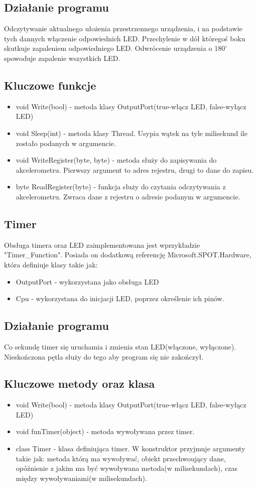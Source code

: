 \documentclass{article}
\begin{document}
\subsection*{Działanie programu}
Odczytywanie aktualnego ułożenia przestrzennego urządzenia, i na podstawie tych dannych włączenie odpowiednich LED. Przechylenie w dół któregoś boku skutkuje zapaleniem odpowiedniego LED. Odwrócenie urządzenia o $180^{\circ}$ spowoduje zapalenie wszystkich LED.
\subsection*{Kluczowe funkcje}
\begin{itemize}
\item void Write(bool) - metoda klasy OutputPort(true-włącz LED, false-wyłącz LED)
\item void Sleep(int) - metoda klasy Thread. Usypia wątek na tyle milisekund ile zostało podanych w argumencie.
\item void WriteRegister(byte, byte) - metoda służy do zapisywania do akcelerometru. Pierwszy argument to adres rejestru, drugi to dane do zapisu. 
\item byte ReadRegister(byte) - funkcja służy do czytania odczytywania z akcelerometru. Zwraca dane z rejestru o adresie podanym w argumencie. 
\end{itemize}
\subsection{Timer}
Obsługa timera oraz LED zaimplementowana jest wprzykładzie "Timer\_Function". Posiada on dodatkową referencję Microsoft.SPOT.Hardware, która definiuje klasy takie jak:
\begin{itemize}
\item OutputPort - wykorzystana jako obsługa LED
\item Cpu - wykorzystana do inicjacji LED, poprzez określenie ich pinów.
\end{itemize}
\subsection*{Działanie programu}
Co sekundę timer się uruchamia i zmienia stan LED(włączone, wyłączone). Nieskończona pętla służy do tego aby program się nie zakończył.
\subsection*{Kluczowe metody oraz klasa}
\begin{itemize}
\item void Write(bool) - metoda klasy OutputPort(true-włącz LED, false-wyłącz LED)
\item void funTimer(object) - metoda wywoływana przez timer.
\item class Timer - klasa definiująca timer. W konstruktor przyjmuje argumenty takie jak: metoda którą ma wywoływać, obiekt przechwoujący dane, opóźnienie z jakim ma być wywoływana metoda(w milisekundach), czas między wywoływaniami(w milisekundach). 
\end{itemize}
\end{document}
